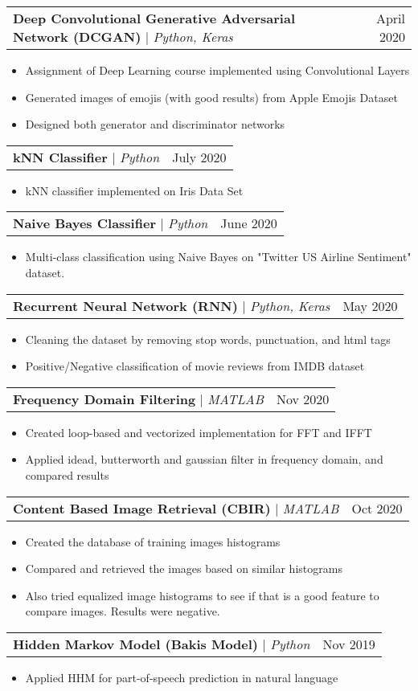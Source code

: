 \documentclass[letterpaper,11pt]{article}
\makeatletter
\newcommand{\resumeItem}[1]{
  \item\small{
    {#1 \vspace{-2pt}}
  }
}
\newcommand{\resumeProjectHeading}[2]{
    \item
    \begin{tabular*}{0.97\textwidth}{l@{\extracolsep{\fill}}r}
      \small#1 & #2 \\
    \end{tabular*}\vspace{-7pt}
}
\newcommand{\resumeItemListStart}{\begin{itemize}}
\newcommand{\resumeItemListEnd}{\end{itemize}\vspace{-5pt}}
\makeatother
\begin{document}
      \resumeProjectHeading
          {\textbf{Deep Convolutional Generative Adversarial Network (DCGAN)} $|$ \emph{Python, Keras}}{April 2020}
          \resumeItemListStart
            \resumeItem{Assignment of Deep Learning course implemented using Convolutional Layers}
            \resumeItem{Generated images of emojis (with good results) from Apple Emojis Dataset}
            \resumeItem{Designed both generator and discriminator networks}
          \resumeItemListEnd
          
      \resumeProjectHeading
          {\textbf{kNN Classifier} $|$ \emph{Python}}{July 2020}
          \resumeItemListStart
            \resumeItem{kNN classifier implemented on Iris Data Set}
          \resumeItemListEnd
          
      \resumeProjectHeading
          {\textbf{Naive Bayes Classifier} $|$ \emph{Python}}{June 2020}
          \resumeItemListStart
            \resumeItem{Multi-class classification using Naive Bayes on "Twitter US Airline Sentiment" dataset.}
          \resumeItemListEnd          
          
      \resumeProjectHeading
          {\textbf{Recurrent Neural Network (RNN)} $|$ \emph{Python, Keras}}{May 2020}
          \resumeItemListStart
            \resumeItem{Cleaning the dataset by removing stop words, punctuation, and html tags}
            \resumeItem{Positive/Negative classification of movie reviews from IMDB dataset}
          \resumeItemListEnd

      \resumeProjectHeading
          {\textbf{Frequency Domain Filtering} $|$ \emph{MATLAB}}{Nov 2020}
          \resumeItemListStart
            \resumeItem{Created loop-based and vectorized implementation for FFT and IFFT}
            \resumeItem {Applied idead, butterworth and gaussian filter in frequency domain, and compared results}
          \resumeItemListEnd
         
      \resumeProjectHeading
          {\textbf{Content Based Image Retrieval (CBIR)} $|$ \emph{MATLAB}}{Oct 2020}
          \resumeItemListStart
            \resumeItem{Created the database of training images histograms}
            \resumeItem {Compared and retrieved the images based on similar histograms}
            \resumeItem{Also tried equalized image histograms to see if that is a good feature to compare images. Results were negative.}
          \resumeItemListEnd         

      \resumeProjectHeading
          {\textbf{Hidden Markov Model (Bakis Model)} $|$ \emph{Python}}{Nov 2019}
          \resumeItemListStart
            \resumeItem{Applied HHM for part-of-speech prediction in natural language}
          \resumeItemListEnd 
\end{document}
